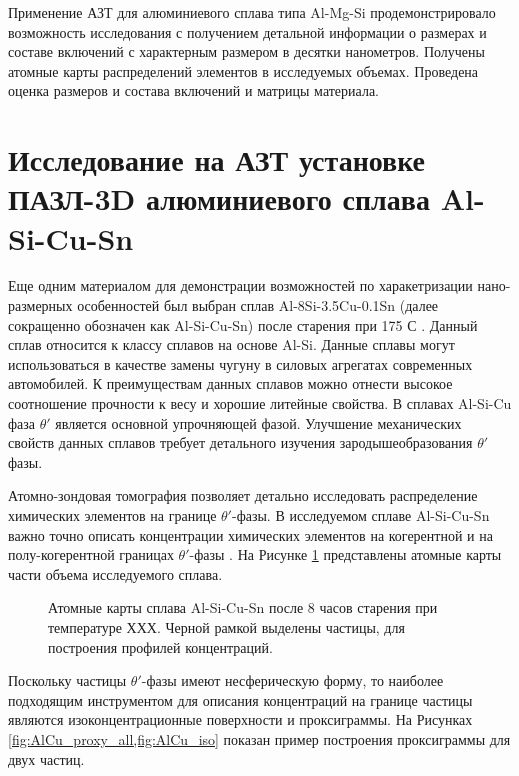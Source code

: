 Применение АЗТ для алюминиевого сплава типа Al-Mg-Si продемонстрировало возможность исследования с получением детальной информации о размерах и составе включений с характерным размером в десятки нанометров. Получены атомные карты распределений элементов в исследуемых объемах. Проведена оценка размеров и состава включений и матрицы материала.

\FloatBarrier

\section{Исследование на АЗТ установке ПАЗЛ-3D алюминиевого сплава Al-Si-Cu-Sn}\label{sec:ch4/sect4}


Еще одним материалом для демонстрации возможностей по харакетризации нано-размерных особенностей был выбран сплав Al-8Si-3.5Cu-0.1Sn (далее сокращенно обозначен как Al-Si-Cu-Sn) после старения при 175 \textdegree С \cite{Akopyan2022A319}. Данный сплав относится к классу сплавов на основе Al-Si. Данные сплавы могут использоваться в качестве замены чугуну в силовых агрегатах современных автомобилей. К преимуществам данных сплавов можно отнести высокое соотношение прочности к весу и хорошие литейные свойства. В сплавах Al-Si-Cu фаза $\theta '$ является основной упрочняющей фазой. Улучшение механических свойств данных сплавов требует детального изучения зародышеобразования $\theta '$ фазы. 

Атомно-зондовая томография позволяет детально исследовать распределение химических элементов на границе $\theta '$-фазы. В исследуемом сплаве Al-Si-Cu-Sn важно точно описать концентрации химических элементов на когерентной и на полу-когерентной границах  $\theta '$-фазы \cite{Akopyan2022A319}. На Рисунке \cref{fig:AlCu_atom_maps} представлены атомные карты части объема исследуемого сплава.

\begin{figure}[htb]
	\caption{Атомные карты сплава Al-Si-Cu-Sn после 8 часов старения при температуре ХХХ. Черной рамкой выделены частицы, для построения профилей концентраций.}
	\label{fig:AlCu_atom_maps}
\end{figure}


Поскольку частицы $\theta '$-фазы имеют несферическую форму, то наиболее подходящим инструментом для описания концентраций на границе частицы являются изоконцентрационные поверхности и проксиграммы. На Рисунках \cref{fig:AlCu_proxy_all,fig:AlCu_iso} показан пример построения проксиграммы для двух частиц.

